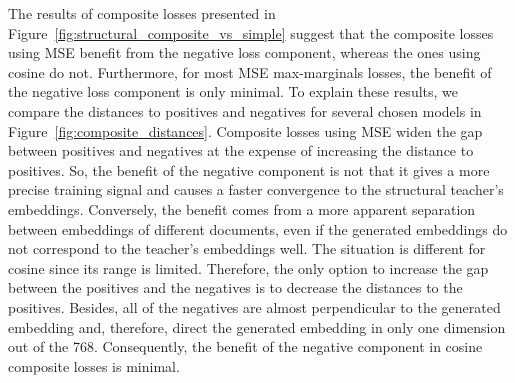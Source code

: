 The results of composite losses presented in
Figure~\ref{fig:structural_composite_vs_simple} suggest that the composite
losses using MSE benefit from the negative loss component, whereas the ones
using cosine do not. Furthermore, for most MSE max-marginals losses, the
benefit of the negative loss component is only minimal. To explain these
results, we compare the distances to positives and negatives for several chosen
models in Figure~\ref{fig:composite_distances}. Composite losses using MSE
widen the gap between positives and negatives at the expense of increasing the
distance to positives. So, the benefit of the negative component is not that it
gives a more precise training signal and causes a faster convergence to the
structural teacher's embeddings. Conversely, the benefit comes from a more
apparent separation between embeddings of different documents, even if the
generated embeddings do not correspond to the teacher's embeddings well. The
situation is different for cosine since its range is limited. Therefore, the
only option to increase the gap between the positives and the negatives is to
decrease the distances to the positives. Besides, all of the negatives are
almost perpendicular to the generated embedding and, therefore, direct the
generated embedding in only one dimension out of the 768. Consequently, the
benefit of the negative component in cosine composite losses is minimal.

